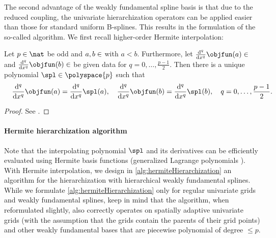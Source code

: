 The second advantage of the weakly fundamental spline basis
is that due to the reduced coupling,
the univariate hierarchization operators can be applied easier
than those for standard uniform B-splines.
This results in the formulation of the so-called
 algorithm.
We first recall higher-order Hermite interpolation:

\begin{lemma}
  \label{lemma:hermiteInterpolation}
  Let $p \in \nat$ be odd and $a, b \in \real$ with $a < b$.
  Furthermore, let
  $\frac{\diff^q}{\dx^q} \objfun(a) \in \real$ and
  $\frac{\diff^q}{\dx^q} \objfun(b) \in \real$ be given data
  for $q = 0, \dotsc, \frac{p-1}{2}$.
  Then there is a unique polynomial $\spl \in \polyspace{p}$ such that
  \begin{equation}
    \frac{\diff^q}{\dx^q} \objfun(a)
    = \frac{\diff^q}{\dx^q} \spl(a),\quad
    \frac{\diff^q}{\dx^q} \objfun(b)
    = \frac{\diff^q}{\dx^q} \spl(b),\quad
    q = 0, \dotsc, \frac{p-1}{2}.
    \hspace*{-10mm}
  \end{equation}
\end{lemma}

\begin{proof}
  See \cite{Freund07Stoer}.
\end{proof}

\paragraph{Hermite hierarchization algorithm}

Note that the interpolating polynomial $\spl$ and its derivatives can be
efficiently evaluated using Hermite basis functions
(generalized Lagrange polynomials \cite{Freund07Stoer}).
With Hermite interpolation, we design
in \cref{alg:hermiteHierarchization} an algorithm
for the hierarchization with hierarchical weakly fundamental splines.
While we formulate \cref{alg:hermiteHierarchization}
only for regular univariate grids and weakly fundamental splines,
keep in mind that the algorithm, when reformulated slightly,
also correctly operates
on spatially adaptive univariate grids
(with the assumption that the grids contain the parents of their grid points)
and other weakly fundamental bases that are
piecewise polynomial of degree $\le p$.

